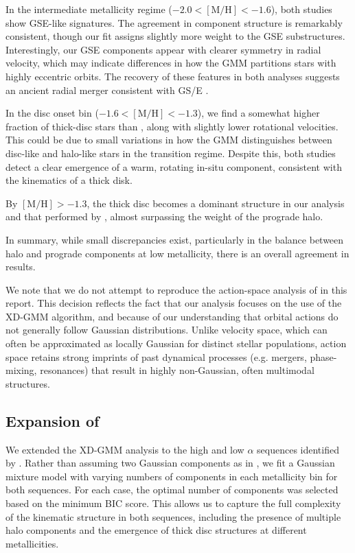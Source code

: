 \documentclass[a4paper,12pt]{article}
\begin{document}
In the intermediate metallicity regime ($-2.0 < \mathrm{[M/H]} < -1.6$), both studies show GSE-like 
signatures. The agreement in component structure is remarkably consistent, though our fit assigns slightly 
more weight to the GSE substructures. Interestingly, our GSE components appear with clearer symmetry in radial 
velocity, which may indicate differences in how the GMM partitions stars with highly eccentric orbits. 
The recovery of these features in both analyses suggests an ancient radial merger consistent with GS/E \citep{Belokurov2020}.

In the disc onset bin ($-1.6 < \mathrm{[M/H]} < -1.3$), we find a somewhat higher fraction of 
thick-disc stars than \citet{zhang2024existencemetalpoordiscmilky}, along with slightly lower rotational 
velocities. This could be due to small variations in how the GMM distinguishes between disc-like and 
halo-like stars in the transition regime. Despite this, both studies detect a clear emergence of a warm, 
rotating in-situ component, consistent with the kinematics of a thick disk.

By $[\mathrm{M/H}] > -1.3$, the thick disc becomes a dominant structure in our analysis and that performed
by \citet{zhang2024existencemetalpoordiscmilky}, almost surpassing the weight of the prograde halo.

In summary, while small discrepancies exist, particularly in the balance between halo and prograde components 
at low metallicity, there is an overall agreement in results.

We note that we do not attempt to reproduce the action-space analysis of \citet{zhang2024existencemetalpoordiscmilky} in this report. 
This decision reflects the fact that our analysis focuses on the use of the XD-GMM algorithm, and because of our
understanding that orbital actions do not generally follow Gaussian distributions. Unlike velocity space, which can often be 
approximated as locally Gaussian for distinct stellar populations, action space retains strong imprints 
of past dynamical processes (e.g. mergers, phase-mixing, resonances) that result in highly non-Gaussian, 
often multimodal structures.



\subsection{\texorpdfstring{Expansion of \citet{Vis2024}}{Expansion of Viswanathan et al.\ (2024)}}


We extended the XD-GMM analysis to the high and low $\alpha$ sequences identified by \citet{Vis2024}. 
Rather than assuming two Gaussian components as in \citet{Vis2024}, we fit a
Gaussian mixture model with varying numbers of components in each metallicity bin for both sequences. 
For each case, the optimal number of components was selected based on the minimum BIC score.
This allows us to capture the full complexity of the kinematic structure in both sequences,
including the presence of multiple halo components and the emergence of thick disc structures 
at different metallicities.
\end{document}
